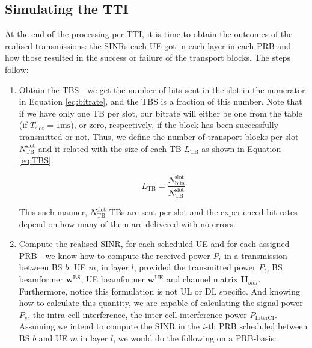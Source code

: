 \subsection{Simulating the TTI}

At the end of the processing per TTI, it is time to obtain the outcomes of the realised transmissions: the SINRs each UE got in each layer in each PRB and how those resulted in the success or failure of the transport blocks. The steps follow:
\begin{enumerate}
    \item Obtain the \ac{TBS} - we get the number of bits sent in the slot in the numerator in Equation \eqref{eq:bitrate}, and the \ac{TBS} is a fraction of this number. Note that if we have only one \ac{TB} per slot, our bitrate will either be one from the table (if $T_\text{slot} = 1\text{ms}$), or zero, respectively, if the block has been successfully transmitted or not. Thus, we define the number of transport blocks per slot $N_\text{TB}^\text{slot}$ and it related with the size of each \ac{TB} $L_\text{TB}$ as shown in Equation \eqref{eq:TBS}.
    
    \begin{equation} \label{eq:TBS}
        L_\text{TB} = \frac{N_\text{bits}^\text{slot}}{N_\text{TB}^\text{slot}}
    \end{equation}

    This such manner, $N_\text{TB}^\text{slot}$ TBs are sent per slot and the experienced bit rates depend on how many of them are delivered with no errors. 
    
    \item Compute the realised SINR, for each scheduled \acs{UE} and for each assigned \ac{PRB} - we know how to compute the received power $P_r$ in a transmission between BS $b$, UE $m$, in layer $l$, provided the transmitted power $P_t$, BS beamformer $\bm{w}^\text{BS}$, UE beamformer $\bm{w}^\text{UE}$ and channel matrix $\bm{H}_{bml}$. Furthermore, notice this formulation is not UL or DL specific. And knowing how to calculate this quantity, we are capable of calculating the signal power $P_s$, the intra-cell interference, the inter-cell interference power $P_\text{InterCI}$. 
    Assuming we intend to compute the SINR in the $i$-th PRB scheduled between BS $b$ and UE $m$ in layer $l$, we would do the following on a PRB-basis:


\end{enumerate}
